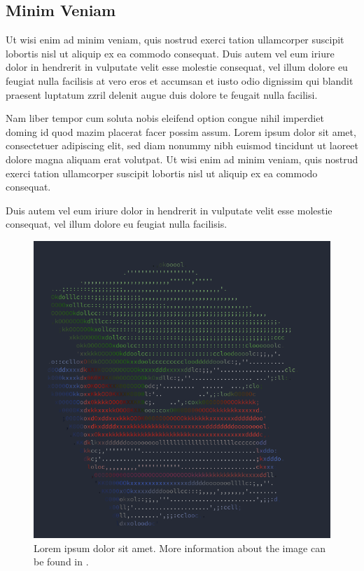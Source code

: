 \subsection{Minim Veniam}
Ut wisi enim ad minim veniam, quis nostrud exerci tation ullamcorper suscipit lobortis nisl ut aliquip ex ea commodo consequat. Duis autem vel eum iriure dolor in hendrerit in vulputate velit esse molestie consequat, vel illum dolore eu feugiat nulla facilisis at vero eros et accumsan et iusto odio dignissim qui blandit praesent luptatum zzril delenit augue duis dolore te feugait nulla facilisi.

Nam liber tempor cum soluta nobis eleifend option congue nihil imperdiet doming id quod mazim placerat facer possim assum. Lorem ipsum dolor sit amet, consectetuer adipiscing elit, sed diam nonummy nibh euismod tincidunt ut laoreet dolore magna aliquam erat volutpat. Ut wisi enim ad minim veniam, quis nostrud exerci tation ullamcorper suscipit lobortis nisl ut aliquip ex ea commodo consequat.

Duis autem vel eum iriure dolor in hendrerit in vulputate velit esse molestie consequat, vel illum dolore eu feugiat nulla facilisis.

\begin{figure}
    \includegraphics[width=15cm]{figures/books.png}
    \caption[Lorem ipsum dolor sit amet.]{Lorem ipsum dolor sit amet. More information about the image can be found in .}
    \label{fig:books2}
\end{figure}

